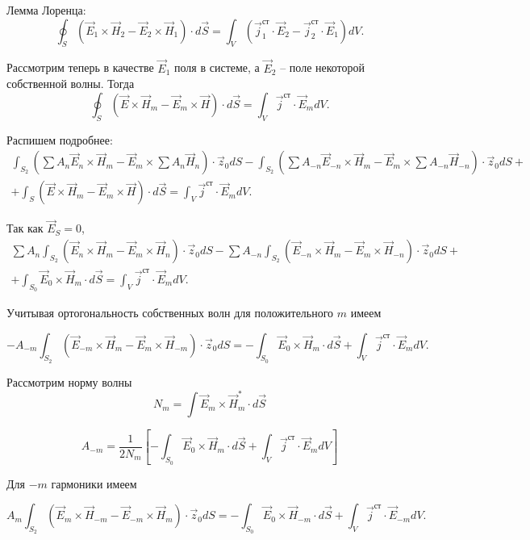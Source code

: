 Лемма Лоренца:
\[
  \oint_S\left( \vec{E}_1\times\vec{H}_2 - \vec{E}_2\times\vec{H}_1 \right)\cdot d\vec{S} = \int_V \left(
  \vec{j}_1^\text{ст}\cdot\vec{E}_2 - \vec{j}_2^\text{ст}\cdot\vec{E}_1\right) dV.
\]

Рассмотрим теперь в качестве \( \vec{E}_1 \) поля в системе, а \( \vec{E}_2 \) -- поле некоторой собственной волны. Тогда
\[
  \oint_S\left( \vec{E}\times\vec{H}_m - \vec{E}_m\times\vec{H} \right)\cdot d\vec{S} = \int_V \vec{j}^\text{ст}\cdot\vec{E}_m dV.
\]

Распишем подробнее:
\begin{gather*}
  \int_{S_2}\left( \sum A_n\vec{E}_n\times\vec{H}_m - \vec{E}_m\times\sum A_n\vec{H}_n \right)\cdot\vec{z}_0 dS
  -\int_{S_2}\left( \sum A_{-n}\vec{E}_{-n}\times\vec{H}_m - \vec{E}_m\times\sum A_{-n}\vec{H}_{-n} \right)\cdot\vec{z}_0 dS +\\+
  \int_S\left( \vec{E}\times\vec{H}_m - \vec{E}_m\times\vec{H} \right)\cdot d\vec{S} = \int_V \vec{j}^\text{ст}\cdot\vec{E}_m dV.
\end{gather*}

Так как \( \vec{E}_S = 0 \),
\begin{gather*}
  \sum A_n\int_{S_2}\left(\vec{E}_n\times\vec{H}_m - \vec{E}_m\times\vec{H}_n \right)\cdot\vec{z}_0 dS
  -\sum A_{-n}\int_{S_2}\left( \vec{E}_{-n}\times\vec{H}_m - \vec{E}_m\times\vec{H}_{-n} \right)\cdot\vec{z}_0 dS +\\+
  \int_{S_0} \vec{E}_0\times\vec{H}_m \cdot d\vec{S} = \int_V \vec{j}^\text{ст}\cdot\vec{E}_m dV.
\end{gather*}

Учитывая ортогональность собственных волн для положительного \( m \) имеем

\[
  -A_{-m}\int_{S_2}\left( \vec{E}_{-m}\times\vec{H}_m - \vec{E}_m\times\vec{H}_{-m} \right)\cdot\vec{z}_0 dS =
  -\int_{S_0} \vec{E}_0\times\vec{H}_m \cdot d\vec{S} + \int_V \vec{j}^\text{ст}\cdot\vec{E}_m dV.
\]

Рассмотрим норму волны
\[
	N_m = \int \vec{E}_m \times \vec{H}_m^* \cdot d\vec{S}
\]

\[
	A_{-m} = \frac{1}{2N_m} \left[ -\int_{S_0} \vec{E}_0\times\vec{H}_m \cdot d\vec{S} + \int_V \vec{j}^\text{ст}\cdot\vec{E}_m dV \right]
\]

Для \( -m \) гармоники имеем

\[
  A_{m}\int_{S_2}\left( \vec{E}_{m}\times\vec{H}_{-m} - \vec{E}_{-m}\times\vec{H}_{m} \right)\cdot\vec{z}_0 dS =
  -\int_{S_0} \vec{E}_0\times\vec{H}_{-m} \cdot d\vec{S} + \int_V \vec{j}^\text{ст}\cdot\vec{E}_{-m} dV.
\]

